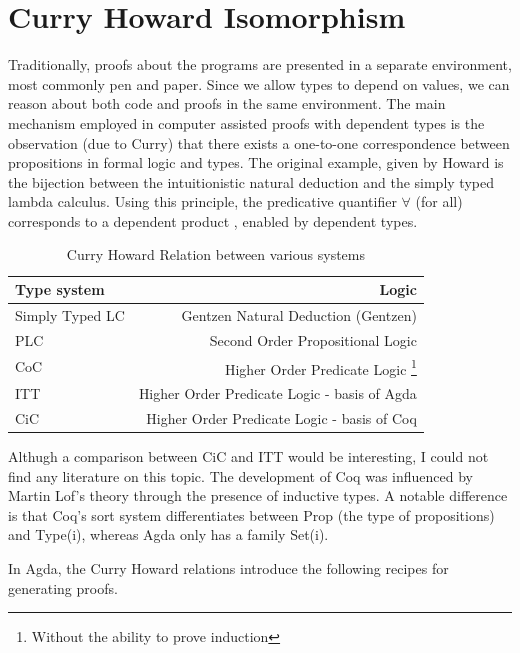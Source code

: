 \documentclass[12pt,twoside,notitlepage]{report}
\begin{document}
\section{Curry Howard Isomorphism}

Traditionally, proofs about the programs are presented in a separate environment, most commonly pen and paper. Since we allow types to depend on values, we can reason about both code and proofs in the same environment. 
The main mechanism employed in computer assisted proofs with dependent types is the observation (due to Curry) that there exists a one-to-one correspondence between propositions in formal logic and types. The original example, given by Howard is the bijection between the intuitionistic natural deduction and the simply typed lambda calculus.
Using this principle, the predicative quantifier $\forall$ (for all) corresponds to a dependent product
\cite{hindely_milner} , enabled by dependent types.


\begin{table}[h!]
\centering 
	\begin{tabular}{l r} 
	\hline
	Type system & Logic \\
	\hline 
	Simply Typed LC  & Gentzen Natural Deduction (Gentzen) \\
	PLC & Second Order Propositional Logic \\
	CoC &  Higher Order Predicate Logic \footnote{Without the ability to prove induction} \\
	ITT & Higher Order Predicate Logic - basis of Agda \\ 
	CiC & Higher Order Predicate Logic - basis of Coq \\   
	\hline 
	\end{tabular}
\caption{Curry Howard Relation between various systems}
\end{table}

Althugh a comparison between CiC and ITT would be interesting, I could not find any literature on this topic. The development of Coq was influenced by Martin Lof’s theory through the presence of inductive types\cite{coq_inductive}. A notable difference is that Coq’s sort system differentiates between Prop (the type of propositions) and Type(i), whereas Agda only has a family Set(i).

In Agda, the Curry Howard relations introduce the following recipes for generating proofs.
\end{document}
